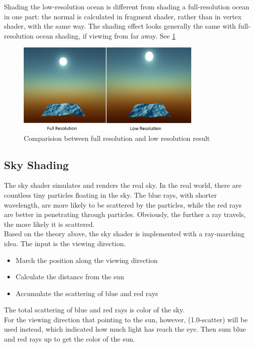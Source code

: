 \documentclass{jcgt}
\begin{document}
Shading the low-resolution ocean is different from shading a full-resolution ocean in one part: the normal is calculated in fragment shader, rather than in vertex shader, with the same way. The shading effect looks generally the same with full-resolution ocean shading, if viewing from far away. See \ref{fig:lowres}

\begin{figure}[htb]
\centering
   \includegraphics[width=0.8\textwidth]{lowres.png}
   \caption{\label{fig:lowres}
      Comparision between full resolution and low resolution result}

\end{figure}
\subsection{Sky Shading}
\label{sec:skyshading}
The sky shader simulates and renders the real sky. In the real world, there are countless tiny particles floating in the sky. The blue rays, with shorter wavelength, are more likely to be scattered by the particles, while the red rays are better in penetrating through particles. Obviously, the further a ray travels, the more likely it is scattered. \\

Based on the theory above, the sky shader is implemented with a ray-marching idea. The input is the viewing direction.
\begin{itemize}
\item[1.] March the position along the viewing direction
\item[2.] Calculate the distance from the sun
\item[3.] Accumulate the scattering of blue and red rays
\end{itemize}
The total scattering of blue and red rays is color of the sky.\\

For the viewing direction that pointing to the sun, however, (1.0-scatter) will be used instead, which indicated how much light has reach the eye. Then sum blue and red rays up to get the color of the sun.
\end{document}
